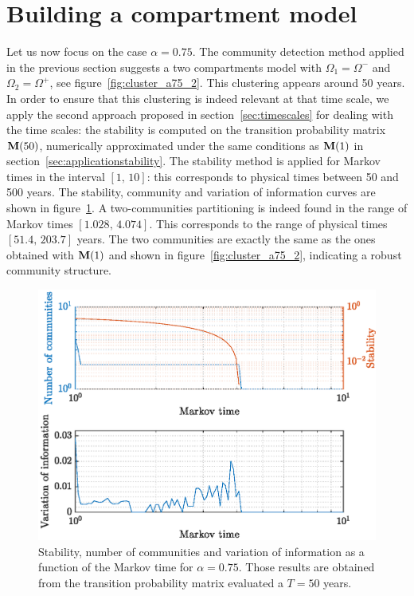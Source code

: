 \newpage
\section{Building a compartment model}
Let us now focus on the case $\alpha = 0.75$. The community detection method applied in the previous section suggests a two compartments model with $\Omega_1 = \Omega^-$ and $\Omega_2 = \Omega^+$, see figure~\ref{fig:cluster_a75_2}. This clustering appears around 50 years. In order to ensure that this clustering is indeed relevant at that time scale, we apply the second approach proposed in section~\ref{sec:timescales} for dealing with the time scales: the stability is computed on the transition probability matrix $\mathbf M(50)$, numerically approximated under the same conditions as $\mathbf M(1)$ in section~\ref{sec:applicationstability}. The stability method is applied for Markov times in the interval $[1,\,10]$: this corresponds to physical times between 50 and 500 years. The stability, community and variation of information curves are shown in figure~\ref{fig:staba75_T50}. A two-communities partitioning is indeed found in the range of Markov times $[1.028,\, 4.074]$. This corresponds to the range of physical times $[51.4,\, 203.7]$ years. The two communities are exactly the same as the ones obtained with $\mathbf M(1)$ and shown in figure~\ref{fig:cluster_a75_2}, indicating a robust community structure. 

\begin{figure}[!htp]
	\centering
	\includegraphics[width = .7\textwidth, height = .4\textheight]{fig/problem2box50/stab_a75.eps}
	\caption{Stability, number of communities and variation of information as a function of the Markov time for $\alpha = 0.75$. Those results are obtained from the transition probability matrix evaluated a $T = 50$ years.}
	\label{fig:staba75_T50}
\end{figure}

